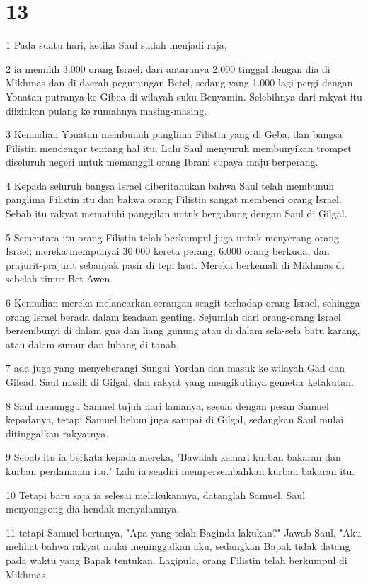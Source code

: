 \chapter{13}

\par 1 Pada suatu hari, ketika Saul sudah menjadi raja,
\par 2 ia memilih 3.000 orang Israel; dari antaranya 2.000 tinggal dengan dia di Mikhmas dan di daerah pegunungan Betel, sedang yang 1.000 lagi pergi dengan Yonatan putranya ke Gibea di wilayah suku Benyamin. Selebihnya dari rakyat itu diizinkan pulang ke rumahnya masing-masing.
\par 3 Kemudian Yonatan membunuh panglima Filistin yang di Geba, dan bangsa Filistin mendengar tentang hal itu. Lalu Saul menyuruh membunyikan trompet diseluruh negeri untuk memanggil orang Ibrani supaya maju berperang.
\par 4 Kepada seluruh bangsa Israel diberitahukan bahwa Saul telah membunuh panglima Filistin itu dan bahwa orang Filistin sangat membenci orang Israel. Sebab itu rakyat mematuhi panggilan untuk bergabung dengan Saul di Gilgal.
\par 5 Sementara itu orang Filistin telah berkumpul juga untuk menyerang orang Israel; mereka mempunyai 30.000 kereta perang, 6.000 orang berkuda, dan prajurit-prajurit sebanyak pasir di tepi laut. Mereka berkemah di Mikhmas di sebelah timur Bet-Awen.
\par 6 Kemudian mereka melancarkan serangan sengit terhadap orang Israel, sehingga orang Israel berada dalam keadaan genting. Sejumlah dari orang-orang Israel bersembunyi di dalam gua dan liang gunung atau di dalam sela-sela batu karang, atau dalam sumur dan lubang di tanah,
\par 7 ada juga yang menyeberangi Sungai Yordan dan masuk ke wilayah Gad dan Gilead. Saul masih di Gilgal, dan rakyat yang mengikutinya gemetar ketakutan.
\par 8 Saul menunggu Samuel tujuh hari lamanya, sesuai dengan pesan Samuel kepadanya, tetapi Samuel belum juga sampai di Gilgal, sedangkan Saul mulai ditinggalkan rakyatnya.
\par 9 Sebab itu ia berkata kepada mereka, "Bawalah kemari kurban bakaran dan kurban perdamaian itu." Lalu ia sendiri mempersembahkan kurban bakaran itu.
\par 10 Tetapi baru saja ia selesai melakukannya, datanglah Samuel. Saul menyongsong dia hendak menyalamnya,
\par 11 tetapi Samuel bertanya, "Apa yang telah Baginda lakukan?" Jawab Saul, "Aku melihat bahwa rakyat mulai meninggalkan aku, sedangkan Bapak tidak datang pada waktu yang Bapak tentukan. Lagipula, orang Filistin telah berkumpul di Mikhmas.
